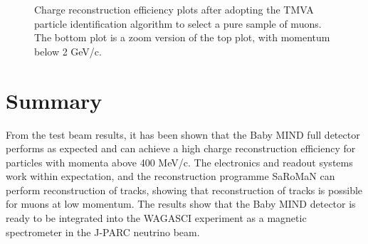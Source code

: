 \begin{figure}[h!]

\caption{Charge reconstruction efficiency plots after adopting the TMVA particle identification algorithm to select a pure sample of muons. The bottom plot is a zoom version of the top plot, with momentum below 2 GeV/c.}
\label{fig:ChargeImproved}
\end{figure}





\section{Summary}
From the test beam results, it has been shown that the Baby MIND full detector performs as expected and can achieve a high charge reconstruction efficiency for particles with momenta above 400 MeV/c. The electronics and readout systems work within expectation, and the reconstruction programme SaRoMaN can perform reconstruction of tracks, showing that reconstruction of tracks is possible for muons at low momentum. The results show that the Baby MIND detector is ready to be integrated into the WAGASCI experiment as a magnetic spectrometer in the J-PARC neutrino beam.



